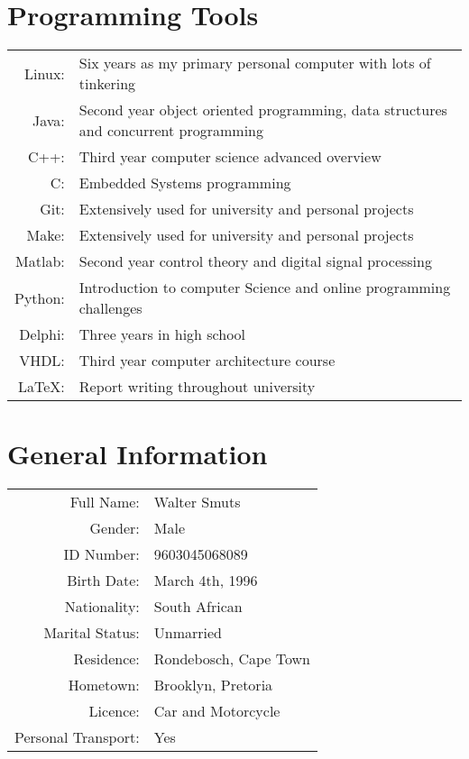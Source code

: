\documentclass[8pt]{extarticle}
\begin{document}
\begin{multicols}{2}
\vfill\null
\columnbreak
\section{Programming Tools}
\begin{center}
\renewcommand{\arraystretch}{2}
\begin{tabular}{r p{5.7cm}}
	Linux: & Six years as my primary personal computer with lots of tinkering \\
	Java: & Second year object oriented programming,
	data structures and concurrent programming \\
	C++: & Third year computer science advanced overview \\
	C: & Embedded Systems programming \\
	Git: & Extensively used for university and personal projects \\
	Make: & Extensively used for university and personal projects \\
	Matlab: & Second year control theory and digital signal processing \\
	Python: & Introduction to computer Science and online programming challenges \\
	Delphi: & Three years in high school \\
	VHDL: & Third year computer architecture course \\
	\LaTeX: & Report writing throughout university \\
\end{tabular}
\end{center}

\section{General Information}

\begin{center}
\renewcommand{\arraystretch}{2}
\begin{tabular}{r l}
	Full Name: & Walter Smuts \\
	Gender: & Male \\
	ID Number: & 9603045068089 \\
	Birth Date: & March 4th, 1996 \\
	Nationality: & South African \\
	Marital Status: & Unmarried \\
	Residence: & Rondebosch, Cape Town \\
	Hometown: & Brooklyn, Pretoria \\
	Licence: & Car and Motorcycle \\
	Personal Transport: & Yes \\
\end{tabular}
\end{center}

\end{multicols}
\end{document}
